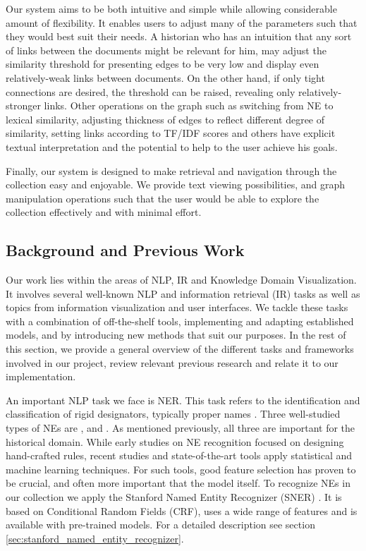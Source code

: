 Our system aims to be both intuitive and simple while allowing considerable amount of flexibility. It enables users to adjust many of the 
parameters such that they would best suit their needs. A historian who has an intuition that any sort of links between the documents might 
be relevant for him, may adjust the similarity threshold for presenting edges to be very low and display even relatively-weak links between documents. On the other hand, if only tight connections 
are desired, the threshold can be raised, revealing only relatively-stronger links. Other operations on the graph such as switching from NE to lexical similarity, adjusting 
thickness of edges to reflect different degree of similarity, setting links according to TF/IDF scores and others have explicit textual 
interpretation and the potential to help to the user achieve his goals. 

Finally, our system is designed to make retrieval and navigation through the collection easy and enjoyable. We provide text viewing 
possibilities, and graph manipulation operations such that the user would be able to explore the collection effectively and with minimal effort.

\subsection {Background and Previous Work}
\label{sec:nlp_background}

Our work lies within the areas of NLP, IR and Knowledge Domain Visualization.
It involves several well-known NLP and information retrieval (IR) tasks as well as topics from information visualization and user interfaces. 
We tackle these tasks with a combination of off-the-shelf tools, implementing and adapting established models, and by introducing new methods 
that suit our purposes. In the rest of this section, we provide a general overview of the different tasks and frameworks involved in our 
project, review relevant previous research and relate it to our implementation. 

An important NLP task we face is NER. This task refers to the identification and classification of rigid designators, 
typically proper names \cite{NEsurvey2009}. Three well-studied types of NEs are ,  and . 
As mentioned previously, all three are important for the historical domain. While early studies on NE recognition focused on designing 
hand-crafted rules, recent studies and state-of-the-art tools apply statistical and machine learning techniques. For such tools, 
good feature selection has proven to be crucial, and often more important that the model itself.  
To recognize NEs in our collection we apply the Stanford Named Entity Recognizer (SNER) \cite{sner}. It is based on Conditional Random Fields (CRF), 
uses a wide range of features and is available with pre-trained models.  For a detailed description see section \ref{sec:stanford_named_entity_recognizer}.


